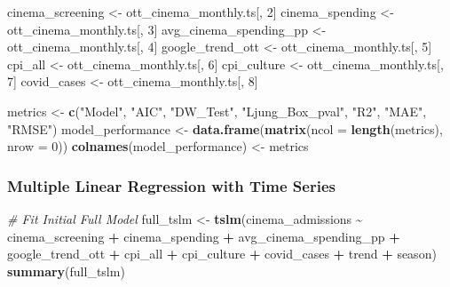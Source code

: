 \documentclass[
]{article}
\newenvironment{Shaded}{\begin{snugshade}}{\end{snugshade}}
\newcommand{\AttributeTok}[1]{\textcolor[rgb]{0.13,0.29,0.53}{#1}}
\newcommand{\CommentTok}[1]{\textcolor[rgb]{0.56,0.35,0.01}{\textit{#1}}}
\newcommand{\DecValTok}[1]{\textcolor[rgb]{0.00,0.00,0.81}{#1}}
\newcommand{\FunctionTok}[1]{\textcolor[rgb]{0.13,0.29,0.53}{\textbf{#1}}}
\newcommand{\NormalTok}[1]{#1}
\newcommand{\OtherTok}[1]{\textcolor[rgb]{0.56,0.35,0.01}{#1}}
\newcommand{\SpecialCharTok}[1]{\textcolor[rgb]{0.81,0.36,0.00}{\textbf{#1}}}
\newcommand{\StringTok}[1]{\textcolor[rgb]{0.31,0.60,0.02}{#1}}
\begin{document}
\begin{Shaded}
\begin{Highlighting}[]
\NormalTok{cinema\_screening }\OtherTok{\textless{}{-}}\NormalTok{ ott\_cinema\_monthly.ts[, }\DecValTok{2}\NormalTok{]}
\NormalTok{cinema\_spending }\OtherTok{\textless{}{-}}\NormalTok{ ott\_cinema\_monthly.ts[, }\DecValTok{3}\NormalTok{]}
\NormalTok{avg\_cinema\_spending\_pp }\OtherTok{\textless{}{-}}\NormalTok{ ott\_cinema\_monthly.ts[, }\DecValTok{4}\NormalTok{]}
\NormalTok{google\_trend\_ott }\OtherTok{\textless{}{-}}\NormalTok{ ott\_cinema\_monthly.ts[, }\DecValTok{5}\NormalTok{]}
\NormalTok{cpi\_all }\OtherTok{\textless{}{-}}\NormalTok{ ott\_cinema\_monthly.ts[, }\DecValTok{6}\NormalTok{]}
\NormalTok{cpi\_culture }\OtherTok{\textless{}{-}}\NormalTok{ ott\_cinema\_monthly.ts[, }\DecValTok{7}\NormalTok{]}
\NormalTok{covid\_cases }\OtherTok{\textless{}{-}}\NormalTok{ ott\_cinema\_monthly.ts[, }\DecValTok{8}\NormalTok{]}

\NormalTok{metrics }\OtherTok{\textless{}{-}} \FunctionTok{c}\NormalTok{(}\StringTok{"Model"}\NormalTok{, }\StringTok{"AIC"}\NormalTok{, }\StringTok{"DW\_Test"}\NormalTok{, }\StringTok{"Ljung\_Box\_pval"}\NormalTok{, }\StringTok{"R2"}\NormalTok{, }\StringTok{"MAE"}\NormalTok{, }\StringTok{"RMSE"}\NormalTok{)}
\NormalTok{model\_performance }\OtherTok{\textless{}{-}} \FunctionTok{data.frame}\NormalTok{(}\FunctionTok{matrix}\NormalTok{(}\AttributeTok{ncol =} \FunctionTok{length}\NormalTok{(metrics), }\AttributeTok{nrow =} \DecValTok{0}\NormalTok{))}
\FunctionTok{colnames}\NormalTok{(model\_performance) }\OtherTok{\textless{}{-}}\NormalTok{ metrics}
\end{Highlighting}
\end{Shaded}

\subsubsection{Multiple Linear Regression with Time
Series}\label{multiple-linear-regression-with-time-series}

\begin{Shaded}
\begin{Highlighting}[]
\CommentTok{\# Fit Initial Full Model}
\NormalTok{full\_tslm }\OtherTok{\textless{}{-}} \FunctionTok{tslm}\NormalTok{(cinema\_admissions }\SpecialCharTok{\textasciitilde{}}\NormalTok{ cinema\_screening }\SpecialCharTok{+}\NormalTok{ cinema\_spending }\SpecialCharTok{+}
\NormalTok{    avg\_cinema\_spending\_pp }\SpecialCharTok{+}\NormalTok{ google\_trend\_ott }\SpecialCharTok{+}\NormalTok{ cpi\_all }\SpecialCharTok{+}\NormalTok{ cpi\_culture }\SpecialCharTok{+}\NormalTok{ covid\_cases }\SpecialCharTok{+}
\NormalTok{    trend }\SpecialCharTok{+}\NormalTok{ season)}
\FunctionTok{summary}\NormalTok{(full\_tslm)}
\end{Highlighting}
\end{Shaded}
\end{document}
